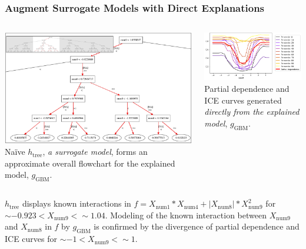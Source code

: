 \documentclass[11pt,
               aspectratio=169,
               hyperref={colorlinks}
               ]{beamer}
\begin{document}
	\begin{frame}[t]
	
		\frametitle{Augment Surrogate Models with Direct Explanations}	
	
		\begin{columns}
				
			\centering			
			\includegraphics[height=0.6\linewidth, width=.95\linewidth]{img/figure_3-eps-converted-to.pdf}\\
  			\tiny{Na\"ive $h_{\text{tree}}$, \textit{a surrogate model}, forms an approximate overall flowchart for the explained model, $g_{\text{GBM}}$.}

			\hspace{5pt}
  			\includegraphics[height=.52\linewidth, width=1.02\linewidth]{img/figure_4.png}\\
  			\tiny{Partial dependence and ICE curves generated \textit{directly from the explained model}, $g_{\text{GBM}}$.}
  			
  		\end{columns}

	\scriptsize{$h_{\text{tree}}$ displays known interactions in $f = X_{\text{num}1} * X_{\text{num}4} + |X_{\text{num}8}| * X_{\text{num}9}^2$ for $\sim -0.923 < X_{\text{num9}} <  \sim 1.04$. Modeling of the known interaction between $X_{\text{num9}}$ and $X_{\text{num8}}$ in $f$ by $g_{\text{GBM}}$ is confirmed by the divergence of partial dependence and ICE curves for $\sim -1 < X_{\text{num9}} <  \sim 1$.}

	\end{frame}
\end{document}
